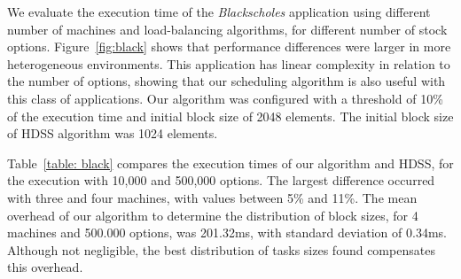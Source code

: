 \documentclass[journal]{IEEEtran}
\begin{document}
We evaluate the execution time of the \emph{Blackscholes} application using
different number of machines and load-balancing algorithms, for different number
of stock options. Figure~\ref{fig:black} shows that performance differences were
larger in more heterogeneous environments. This application has linear
complexity in relation to the number of options, showing that our scheduling
algorithm is also useful with this class of applications. Our algorithm was
configured with a threshold of 10\% of the execution time and initial block size
of 2048 elements. The initial block size of HDSS algorithm was 1024 elements.

Table~\ref{table: black} compares the execution times of our algorithm and HDSS,
for the execution with 10,000 and 500,000 options. The largest difference
occurred with three and four machines, with values between 5\% and 11\%. The
mean overhead of our algorithm to determine the distribution of block sizes, for
4 machines and 500.000 options, was 201.32ms, with standard deviation of 0.34ms.
Although not negligible, the best distribution of tasks sizes found compensates
this overhead.



\end{document}
